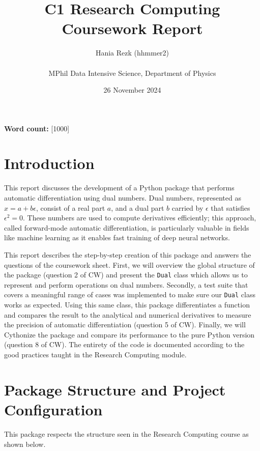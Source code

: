 \documentclass[a4paper,12pt]{article}
\title{\Huge \textbf{C1 Research Computing Coursework Report}}
\author{Hania Rezk (hhmmer2) \\ 
\\
MPhil Data Intensive Science, Department of Physics}
\date{26 November 2024}
\begin{document}
\maketitle


\noindent \textbf{Word count:} [1000] \\

\newpage  
\tableofcontents

\newpage  


\section{Introduction}
This report discusses the development of a Python package that performs automatic differentiation using dual numbers. Dual numbers, represented as $x = a + b\epsilon$, consist of a real part $a$, and a dual part $b$ carried by $\epsilon$ that satisfies $\epsilon^2 = 0$. These numbers are used to compute derivatives efficiently; this approach, called forward-mode automatic differentiation, is particularly valuable in fields like machine learning as it enables fast training of deep neural networks.

This report describes the step-by-step creation of this package and answers the questions of the coursework sheet. First, we will overview the global structure of the package (question 2 of CW) and present the \texttt{Dual} class which allows us to represent and perform operations on dual numbers. Secondly, a test suite that covers a meaningful range of cases was implemented to make sure our \texttt{Dual} class works as expected. Using this same class, this package differentiates a function and compares the result to the analytical and numerical derivatives to measure the precision of automatic differentiation (question 5 of CW). Finally, we will Cythonize the package and compare its performance to the pure Python version (question 8 of CW). The entirety of the code is documented according to the good practices taught in the Research Computing module.

\section{Package Structure and Project Configuration}
This package respects the structure seen in the Research Computing course as shown below.
\end{document}
